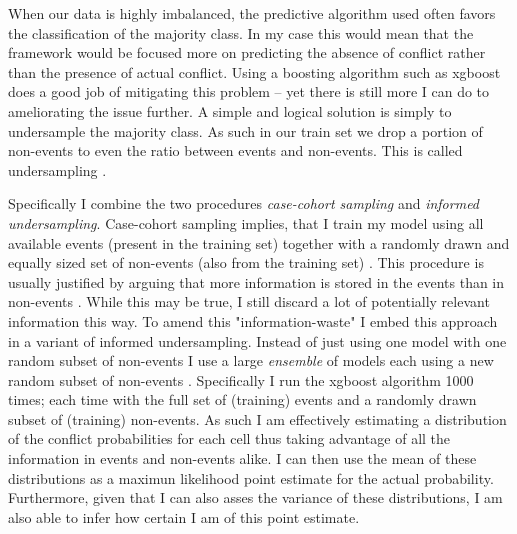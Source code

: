 \documentclass[a4paper]{article}
\begin{document}
When our data is highly imbalanced, the predictive algorithm used often favors the classification of the majority class. In my case this would mean that the framework would be focused more on predicting the absence of conflict rather than the presence of actual conflict. Using a boosting algorithm such as xgboost does a good job of mitigating this problem -- yet there is still more I can do to ameliorating the issue further. A simple and logical solution is simply to undersample the majority class. As such in our train set we drop a portion of non-events to even the ratio between events and non-events. This is called undersampling \citep[1266-1267]{He_2008}.\par


Specifically I combine the two procedures \emph{case-cohort sampling} and \emph{informed undersampling}. Case-cohort sampling implies, that I train my model using all available events (present in the training set) together with a randomly drawn and equally sized set of non-events (also from the training set)  \citep[142]{King_Zeng_2001}. This procedure is usually justified by arguing that more information is stored in the events than in non-events \cite[139]{King_Zeng_2001}. While this may be true, I still discard a lot of potentially relevant information this way. To amend this "information-waste" I embed this approach in a variant of informed undersampling. Instead of just using one model with one random subset of non-events I use a large \emph{ensemble} of models each using a new random subset of non-events \cite[1267]{He_2008}. Specifically I run the xgboost algorithm 1000 times; each time with the full set of (training) events and a randomly drawn subset of (training) non-events. As such I am effectively estimating a distribution of the conflict probabilities for each cell thus taking advantage of all the information in events and non-events alike. I can then use the mean of these distributions as a maximun likelihood point estimate for the actual probability. Furthermore, given that I can also asses the variance of these distributions, I am also able to infer how certain I am of this point estimate.\par 
\end{document}
